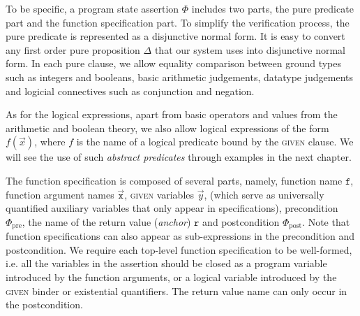 To be specific, a program state assertion $\Phi$ includes two parts, 
the pure predicate part and the function specification part. 
To simplify the verification process, the pure predicate is represented as 
a disjunctive normal form. It is easy to convert any first order pure
proposition $\Delta$ that our system uses into disjunctive normal form. In each pure clause,
we allow equality comparison between ground types such as integers and booleans,
basic arithmetic judgements, datatype judgements and logicial connectives
such as conjunction and negation. 

As for the logical expressions, apart from basic operators and values from
the arithmetic and boolean theory, we also allow logical expressions of the form
$f(\vec{x})$, where $f$ is the name of a logical predicate bound
by the \textsc{given} clause. We will see the use of such \emph{abstract predicates}
through examples in the next chapter.

The function specification is composed of several parts, namely, function name
$\texttt{f}$, function argument names $\vec{\texttt{x}}$, \textsc{given} variables $\vec{y}$, (which serve as universally quantified auxiliary variables that only appear in specifications), precondition $\Phi_{\text{pre}}$, the name of the return value (\emph{anchor}) $\texttt{r}$ and postcondition $\Phi_{\text{post}}$. Note that function specifications can also appear as sub-expressions in the precondition and postcondition. We require each top-level function specification to be 
well-formed, i.e. all the variables in the assertion should be closed as a
program variable introduced by the function arguments, or a
logical variable introduced by the \textsc{given} binder or existential quantifiers. The return value name can only occur in the postcondition.


